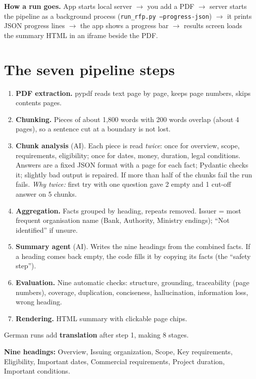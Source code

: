 \textbf{How a run goes.} App starts local server $\rightarrow$ you add a PDF $\rightarrow$ server starts the pipeline as a background process (\texttt{run\_rfp.py --progress-json}) $\rightarrow$ it prints JSON progress lines $\rightarrow$ the app shows a progress bar $\rightarrow$ results screen loads the summary HTML in an iframe beside the PDF.

\section{The seven pipeline steps}
\begin{enumerate}
\item \textbf{PDF extraction.} pypdf reads text page by page, keeps page numbers, skips contents pages.
\item \textbf{Chunking.} Pieces of about 1,800 words with 200 words overlap (about 4 pages), so a sentence cut at a boundary is not lost.
\item \textbf{Chunk analysis} (AI). Each piece is read \emph{twice}: once for overview, scope, requirements, eligibility; once for dates, money, duration, legal conditions. Answers are a fixed JSON format with a page for each fact; Pydantic checks it; slightly bad output is repaired. If more than half of the chunks fail the run fails. \emph{Why twice:} first try with one question gave 2 empty and 1 cut-off answer on 5 chunks.
\item \textbf{Aggregation.} Facts grouped by heading, repeats removed. Issuer = most frequent organisation name (Bank, Authority, Ministry endings); ``Not identified'' if unsure.
\item \textbf{Summary agent} (AI). Writes the nine headings from the combined facts. If a heading comes back empty, the code fills it by copying its facts (the ``safety step'').
\item \textbf{Evaluation.} Nine automatic checks: structure, grounding, traceability (page numbers), coverage, duplication, conciseness, hallucination, information loss, wrong heading.
\item \textbf{Rendering.} HTML summary with clickable page chips.
\end{enumerate}
German runs add \textbf{translation} after step 1, making 8 stages.

\textbf{Nine headings:} Overview, Issuing organization, Scope, Key requirements, Eligibility, Important dates, Commercial requirements, Project duration, Important conditions.


